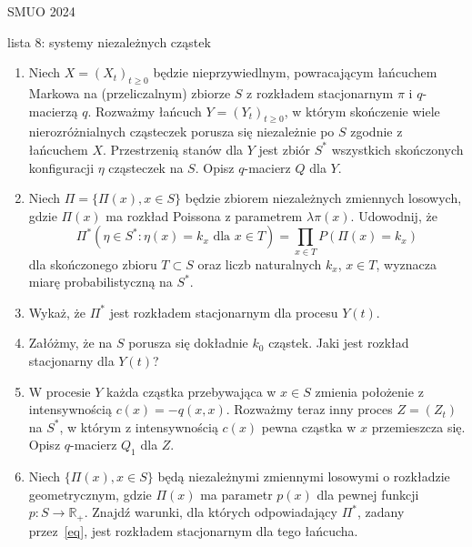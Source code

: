 \documentclass{article}
\begin{document}
SMUO 2024

lista 8: systemy niezależnych cząstek

\begin{enumerate}



\item Niech $X=(X_t)_{t \geq 0}$ będzie nieprzywiedlnym, powracającym łańcuchem Markowa na (przeliczalnym) zbiorze $S$ z rozkładem stacjonarnym $\pi$ i $q$-macierzą $q$. Rozważmy łańcuch $Y=(Y_t)_{t \geq 0}$, w którym skończenie wiele nierozróżnialnych cząsteczek porusza się niezależnie po $S$ zgodnie z łańcuchem $X$. 
Przestrzenią stanów dla $Y$ jest zbiór $S^*$ wszystkich skończonych konfiguracji $\eta$ cząsteczek na $S$. 
Opisz $q$-macierz $Q$ dla $Y$.

\item Niech $\Pi = \{\Pi(x), x \in S\}$ będzie zbiorem niezależnych zmiennych losowych, gdzie $\Pi(x)$ ma rozkład Poissona z parametrem $\lambda \pi(x)$. Udowodnij, że
\begin{equation}\label{eq}
\Pi^*(\eta \in S^* : \eta(x) = k_x \text{ dla } x \in T) = \prod_{x \in T} P(\Pi(x) = k_x)
\end{equation}
dla skończonego zbioru $T \subset S$ oraz liczb naturalnych $k_x$, $x \in T$, wyznacza miarę probabilistyczną na $S^*$.

\item Wykaż, że $\Pi^*$ jest rozkładem stacjonarnym dla procesu $Y(t)$.

\item Załóżmy, że na $S$ porusza się dokładnie $k_0$ cząstek. 
Jaki jest rozkład stacjonarny dla $Y(t)$?

\item W procesie $Y$ każda cząstka przebywająca w $x \in S$ zmienia położenie z intensywnością $c(x) = -q(x,x)$. Rozważmy teraz inny proces $Z = (Z_t)$ na $S^*$, w którym z intensywnością $c(x)$ pewna cząstka w $x$ przemieszcza się. 
Opisz $q$-macierz $Q_1$ dla $Z$.

\item Niech $\{\Pi(x), x \in S\}$ będą niezależnymi zmiennymi losowymi o rozkładzie geometrycznym, gdzie $\Pi(x)$ ma parametr $p(x)$ dla pewnej funkcji $p \colon S \to \mathbb{R}_+$. 
Znajdź warunki, dla których odpowiadający $\Pi^*$, zadany przez~\eqref{eq}, jest rozkładem stacjonarnym dla tego łańcucha.


\end{enumerate}
\end{document}
